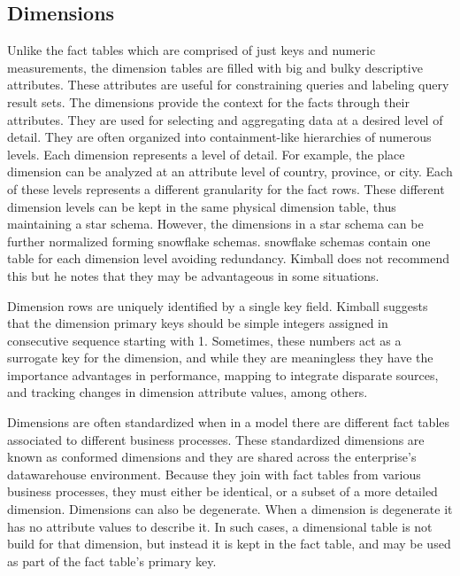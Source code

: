 \documentclass[]{article}
\begin{document}

\subsection{Dimensions} %
\label{sub:dimensions}
Unlike the fact tables which are comprised of just keys and numeric measurements, the dimension tables are filled with big and bulky
descriptive attributes. These attributes are useful for constraining queries and labeling query result sets. The dimensions provide the
context for the facts through their attributes. They are used for selecting and aggregating data at a desired level of detail. They are
often organized into containment-like hierarchies of numerous levels. Each dimension represents a level of detail. For example, the
place dimension can be analyzed at an attribute level of country, province, or city. Each of these levels represents a different
granularity for the fact rows. These different dimension levels can be kept in the same physical dimension table, thus maintaining a
star schema. However, the dimensions in a star schema can be further normalized forming snowflake schemas. snowflake schemas contain one
table for each dimension level avoiding redundancy. Kimball does not recommend this but he notes that they may be advantageous in some
situations.

Dimension rows are uniquely identified by a single key field. Kimball suggests that the dimension primary keys should be simple integers
assigned in consecutive sequence starting with 1. Sometimes, these numbers act as a surrogate key for the dimension, and while they are
meaningless they have the importance advantages in performance, mapping to integrate disparate sources, and tracking changes in
dimension attribute values, among others.

Dimensions are often standardized when in a model there are different fact tables associated to different business processes. These
standardized dimensions are known as conformed dimensions and they are shared across the enterprise's datawarehouse environment. Because
they join with fact tables from various business processes, they must either be identical, or a subset of a more detailed dimension.
Dimensions can also be degenerate. When a dimension is degenerate it has no attribute values to describe it. In such cases, a
dimensional table is not build for that dimension, but instead it is kept in the fact table, and may be used as part of the fact table's
primary key.
\end{document}
